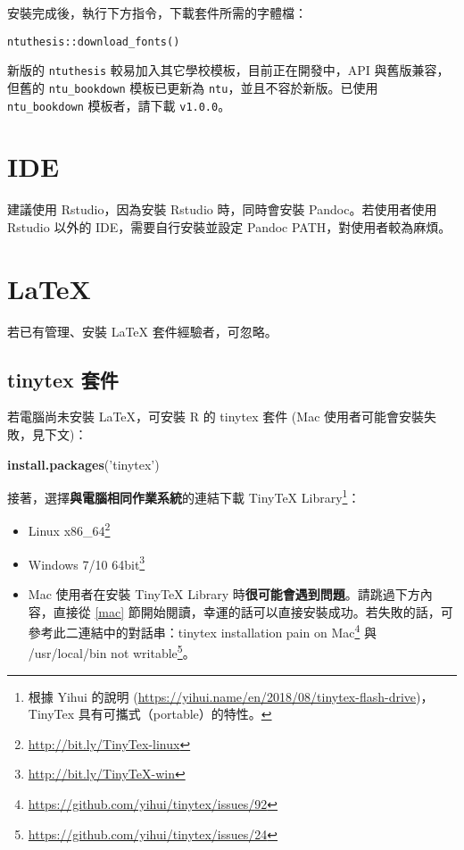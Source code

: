 \documentclass[oneside]{book}
\newenvironment{Shaded}{\begin{snugshade}}{\end{snugshade}}
\newcommand{\KeywordTok}[1]{\textcolor[rgb]{0.13,0.29,0.53}{\textbf{#1}}}
\newcommand{\NormalTok}[1]{#1}
\newcommand{\StringTok}[1]{\textcolor[rgb]{0.31,0.60,0.02}{#1}}
\renewcommand{\href}[2]{#2\footnote{\url{#1}}}
\providecommand{\tightlist}{%
  \setlength{\itemsep}{0pt}\setlength{\parskip}{0pt}}
\theoremstyle{definition}
\theoremstyle{definition}
\theoremstyle{definition}
\theoremstyle{remark}
\begin{document}
安裝完成後，執行下方指令，下載套件所需的字體檔：

\begin{verbatim}
ntuthesis::download_fonts()
\end{verbatim}

新版的 \texttt{ntuthesis} 較易加入其它學校模板，目前正在開發中，API 與舊版兼容，但舊的 \texttt{ntu\_bookdown} 模板已更新為 \texttt{ntu}，並且不容於新版。已使用 \texttt{ntu\_bookdown} 模板者，請下載 \texttt{v1.0.0}。

\hypertarget{ide}{%
\section{IDE}\label{ide}}

建議使用 Rstudio，因為安裝 Rstudio 時，同時會安裝 Pandoc。若使用者使用 Rstudio 以外的 IDE，需要自行安裝並設定 Pandoc PATH，對使用者較為麻煩。

\hypertarget{latex}{%
\section{LaTeX}\label{latex}}

若已有管理、安裝 LaTeX 套件經驗者，可忽略。

\hypertarget{tinytex-ux5957ux4ef6}{%
\subsection{tinytex 套件}\label{tinytex-ux5957ux4ef6}}

若電腦尚未安裝 LaTeX，可安裝 R 的 tinytex 套件 (Mac 使用者可能會安裝失敗，見下文)：

\begin{Shaded}
\begin{Highlighting}[]
\KeywordTok{install.packages}\NormalTok{(}\StringTok{'tinytex'}\NormalTok{)}
\end{Highlighting}
\end{Shaded}

接著，選擇\textbf{與電腦相同作業系統}的連結下載 TinyTeX Library\footnote{根據 Yihui 的說明 (\url{https://yihui.name/en/2018/08/tinytex-flash-drive})，TinyTex 具有可攜式（portable）的特性。}：

\begin{itemize}
\tightlist
\item
  \href{http://bit.ly/TinyTex-linux}{Linux x86\_64}
\item
  \href{http://bit.ly/TinyTeX-win}{Windows 7/10 64bit}
\item
  Mac 使用者在安裝 TinyTeX Library 時\textbf{很可能會遇到問題}。請跳過下方內容，直接從 \ref{mac} 節開始閱讀，幸運的話可以直接安裝成功。若失敗的話，可參考此二連結中的對話串：\href{https://github.com/yihui/tinytex/issues/92}{tinytex installation pain on Mac} 與 \href{https://github.com/yihui/tinytex/issues/24}{/usr/local/bin not writable}。
\end{itemize}
\end{document}
